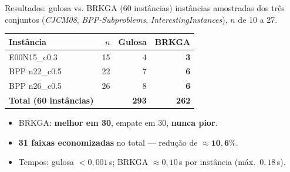 \documentclass[aspectratio=169]{beamer}
\begin{document}
\begin{frame}{Resultados: gulosa vs. BRKGA (60 instâncias)}
   instâncias amostradas dos três conjuntos (\textit{CJCM08},
  \textit{BPP-Subproblems}, \textit{InterestingInstances}), $n$ de 10 a 27.
  \vspace{0.5em}

  \begin{tabular}{lrrr}
    \toprule
    Instância & $n$ & Gulosa & BRKGA \\
    \midrule
    E00N15\_c0.3            & 15 & 4 & \textbf{3} \\
    BPP n22\_c0.5           & 22 & 7 & \textbf{6} \\
    BPP n26\_c0.5           & 26 & 8 & \textbf{6} \\
    \midrule
    \textbf{Total (60 instâncias)} & & \textbf{293} & \textbf{262} \\
    \bottomrule
  \end{tabular}
  \vspace{0.6em}
  \begin{itemize}
    \item BRKGA: \textbf{melhor em 30}, empate em 30, \textbf{nunca pior}.
    \item \textbf{31 faixas economizadas} no total --- redução de
          $\approx \mathbf{10{,}6\%}$.
    \item Tempos: gulosa $<0{,}001$\,s; BRKGA $\approx 0{,}10$\,s por
          instância (máx.\ $0{,}18$\,s).
  \end{itemize}
\end{frame}
\end{document}
